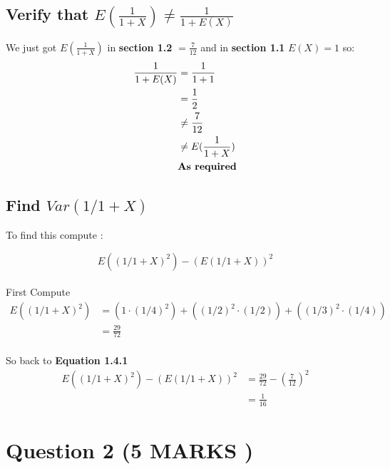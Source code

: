 \documentclass[10pt]{article}
\begin{document}
\subsection{Verify that $E(\frac{1}{1+X}) \neq \frac{1}{1+E(X)}$ }
We just got $E(\frac{1}{1+X})$ in \textbf{section 1.2} $ = \frac{7}{12}$ and in \textbf{section 1.1} $E(X)=1$ so:
\begin{align*}
    \frac{1}{1+E(X)} &= \frac{1}{1+1}\\
                     &= \frac{1}{2}\\
                     &\neq \frac{7}{12} \\
                     &\neq E(\frac{1}{1+X})\\
                     & \text{\textbf{As required}}\\
\end{align*}

\subsection{Find $Var(1/1+X)$}
To find this compute :

\begin{equation}
    E((1/1+X)^2) - (E(1/1+X))^2
\end{equation}
\\
First Compute
\begin{align*}
    E((1/1+X)^2) &= (1 \cdot (1/4)^2) + ((1/2)^2 \cdot (1/2)) + ((1/3)^2 \cdot (1/4)) \\
                 &= \frac{29}{72}
\end{align*}
\\
So back to \textbf{Equation 1.4.1}
\begin{align*}
    E((1/1+X)^2) - (E(1/1+X))^2 &= \frac{29}{72} - (\frac{7}{12})^2 \\
                                &= \frac{1}{16}
\end{align*}

\section{Question 2 (5 MARKS )}
\end{document}
